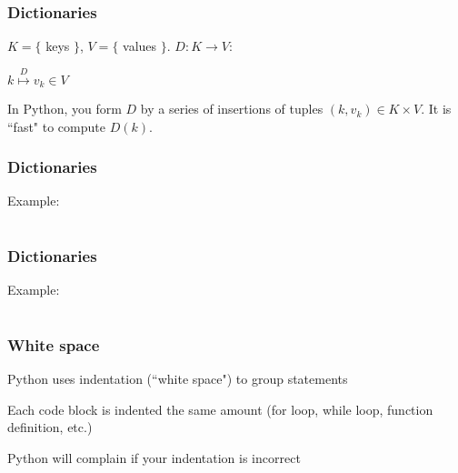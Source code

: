 \documentclass{beamer}
\begin{document}
\begin{frame}
\frametitle{Dictionaries}

$K = \{$ keys $\}$, $V = \{$ values $\}$.  $D: K \rightarrow V$:

\huge{
\begin{center}
$k \stackrel{D}{\longmapsto} v_k \in V$
\end{center}
} \normalsize{}

\vspace{0.2in}

In Python, you form $D$ by a series of insertions of tuples $(k, v_k) \in K \times V$.  It is ``fast" to compute $D(k)$.

\end{frame}

\begin{frame}
\frametitle{Dictionaries}

Example:

\begin{center}
\begin{tabular}{c}

\end{tabular}
\end{center}

\end{frame}


\begin{frame}
\frametitle{Dictionaries}

Example:

\begin{center}
\begin{tabular}{c}

\end{tabular}
\end{center}

\end{frame}


\begin{frame}
\frametitle{White space}

Python uses indentation (``white space") to group statements

\vspace{0.15in}

Each code block is indented the same amount (for loop, while loop, function definition, etc.)

\vspace{0.15in}

Python will complain if your indentation is incorrect
\end{frame}
\end{document}
